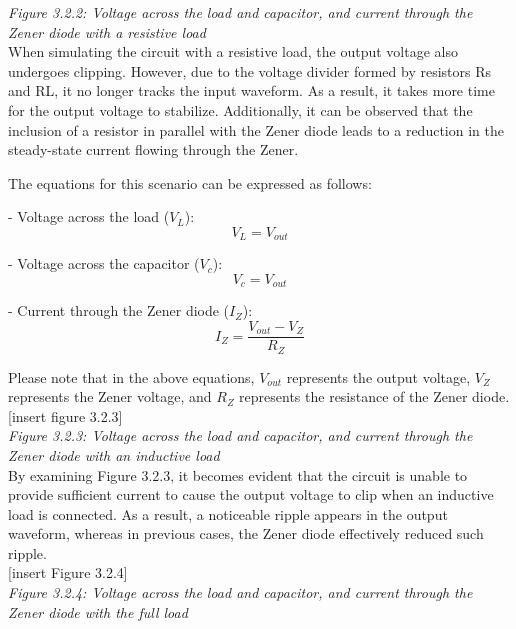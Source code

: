 \emph{Figure 3.2.2: Voltage across the load and capacitor, and current through the Zener diode with a resistive load
}\\


When simulating the circuit with a resistive load, the output voltage also undergoes clipping. However, due to the voltage divider formed by resistors Rs and RL, it no longer tracks the input waveform. As a result, it takes more time for the output voltage to stabilize. Additionally, it can be observed that the inclusion of a resistor in parallel with the Zener diode leads to a reduction in the steady-state current flowing through the Zener.

The equations for this scenario can be expressed as follows:

- Voltage across the load ($V_L$):
\[V_L = V_{out}\]

- Voltage across the capacitor ($V_c$):
\[V_c = V_{out}\]

- Current through the Zener diode ($I_Z$):
\[I_Z = \frac{V_{out} - V_Z}{R_Z}\]

Please note that in the above equations, $V_{out}$ represents the output voltage, $V_Z$ represents the Zener voltage, and $R_Z$ represents the resistance of the Zener diode.\\

[insert figure 3.2.3]\\

\emph{Figure 3.2.3: Voltage across the load and capacitor, and current through the Zener diode with an inductive load}\\

By examining Figure 3.2.3, it becomes evident that the circuit is unable to provide sufficient current to cause the output voltage to clip when an inductive load is connected. As a result, a noticeable ripple appears in the output waveform, whereas in previous cases, the Zener diode effectively reduced such ripple.\\

[insert Figure 3.2.4]\\

\emph{Figure 3.2.4: Voltage across the load and capacitor, and current through the Zener diode with the full load}\\


